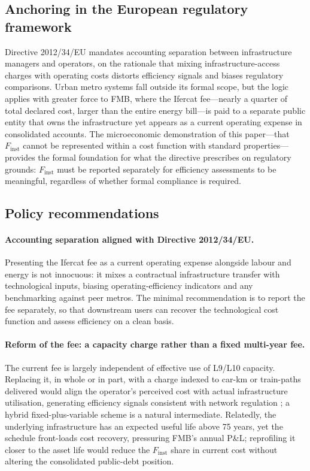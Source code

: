 \documentclass[11pt,a4paper]{article}
\begin{document}
\subsection{Anchoring in the European regulatory framework}
Directive 2012/34/EU \citep{directive2012} mandates accounting separation
between infrastructure managers and operators, on the rationale that
mixing infrastructure-access charges with operating costs distorts
efficiency signals and biases regulatory comparisons. Urban metro systems
fall outside its formal scope, but the logic applies with greater force to
FMB, where the Ifercat fee---nearly a quarter of total declared cost,
larger than the entire energy bill---is paid to a separate public entity
that owns the infrastructure yet appears as a current operating expense
in consolidated accounts. The microeconomic demonstration of this
paper---that $F_{\text{inst}}$ cannot be represented within a cost
function with standard properties---provides the formal foundation for
what the directive prescribes on regulatory grounds: $F_{\text{inst}}$
must be reported separately for efficiency assessments to be meaningful,
regardless of whether formal compliance is required.

\subsection{Policy recommendations}

\paragraph{Accounting separation aligned with Directive 2012/34/EU.}
Presenting the Ifercat fee as a current operating expense alongside labour
and energy is not innocuous: it mixes a contractual infrastructure
transfer with technological inputs, biasing operating-efficiency
indicators and any benchmarking against peer metros. The minimal
recommendation is to report the fee separately, so that downstream users
can recover the technological cost function and assess efficiency on a
clean basis.

\paragraph{Reform of the fee: a capacity charge rather than a fixed
multi-year fee.} The current fee is largely independent of effective use
of L9/L10 capacity. Replacing it, in whole or in part, with a charge
indexed to car-km or train-paths delivered would align the operator's
perceived cost with actual infrastructure utilisation, generating
efficiency signals consistent with network regulation
\citep{joskow2008,gomezlobo2014}; a hybrid fixed-plus-variable scheme is a
natural intermediate. Relatedly, the underlying infrastructure has an
expected useful life above 75 years, yet the schedule front-loads cost
recovery, pressuring FMB's annual P\&L; reprofiling it closer to the asset
life would reduce the $F_{\text{inst}}$ share in current cost without
altering the consolidated public-debt position.
\end{document}
